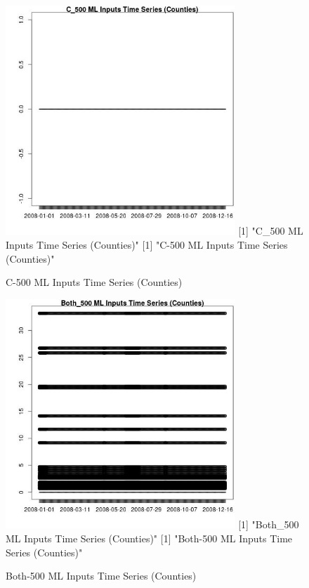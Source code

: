\begin{figure} 
\centering  
\includegraphics[width=0.77\textwidth]{Code_Outputs/ML_input_report_ML_input_CountyGeometricCentroids_Locations_Dates_part_c_2008-01-01to2008-12-31_C_500TS.jpg} 
[1] "C_500 ML Inputs Time Series (Counties)"
[1] "C-500 ML Inputs Time Series (Counties)"
\caption{\label{fig:ML_input_report_ML_input_CountyGeometricCentroids_Locations_Dates_part_c_2008-01-01to2008-12-31C_500TS}C-500 ML Inputs Time Series (Counties)} 
\end{figure} 
 

\begin{figure} 
\centering  
\includegraphics[width=0.77\textwidth]{Code_Outputs/ML_input_report_ML_input_CountyGeometricCentroids_Locations_Dates_part_c_2008-01-01to2008-12-31_Both_500TS.jpg} 
[1] "Both_500 ML Inputs Time Series (Counties)"
[1] "Both-500 ML Inputs Time Series (Counties)"
\caption{\label{fig:ML_input_report_ML_input_CountyGeometricCentroids_Locations_Dates_part_c_2008-01-01to2008-12-31Both_500TS}Both-500 ML Inputs Time Series (Counties)} 
\end{figure} 
 

